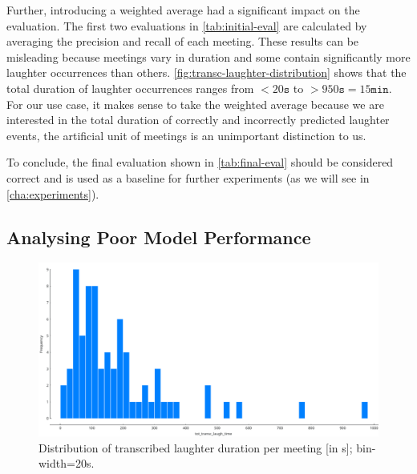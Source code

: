 \documentclass[bsc,frontabs,parskip,deptreport]{infthesis}
\begin{document}
Further, introducing a weighted average had a significant impact on the evaluation. The first two evaluations in \autoref{tab:initial-eval} are calculated by averaging the precision and recall of each meeting.
These results can be misleading because meetings vary in duration and some contain significantly more laughter occurrences than others.
\autoref{fig:transc-laughter-distribution} shows that the total duration of laughter occurrences ranges from $<20\mathtt{s}$ to $>950\mathtt{s}=15\mathtt{min}$.
For our use case, it makes sense to take the weighted average because we are interested in the total duration of correctly and incorrectly predicted laughter events, the artificial unit of meetings is an unimportant distinction to us.

To conclude, the final evaluation shown in \autoref{tab:final-eval} should be considered correct and is used as a baseline for further experiments (as we will see in \autoref{cha:experiments}).



\subsection{Analysing Poor Model Performance}

\begin{figure}
    \centering
    \includegraphics[width=13cm]{imgs/distributions/transcribed_laughter_time_distribution.png}
    \caption{Distribution of transcribed laughter duration per meeting [in s]; bin-width=20s.}
    \label{fig:transc-laughter-distribution}
\end{figure}
\end{document}
